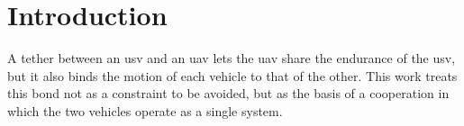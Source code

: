 
\chapter{Introduction}
\label{chapter:introduction}

A tether between an \gls{usv} and an \gls{uav} lets the \gls{uav} share the endurance of the \gls{usv}, but it also binds the motion of each vehicle to that of the other. This work treats this bond not as a constraint to be avoided, but as the basis of a cooperation in which the two vehicles operate as a single system.






